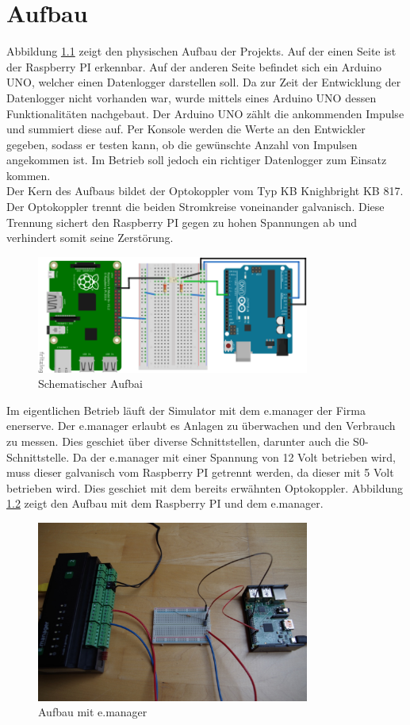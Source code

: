 \chapter{Aufbau}
Abbildung \ref{aufbau} zeigt den physischen Aufbau der Projekts. Auf der einen Seite ist der Raspberry PI erkennbar. Auf der anderen Seite befindet sich ein Arduino UNO, welcher einen Datenlogger darstellen soll. Da zur Zeit der Entwicklung der Datenlogger nicht vorhanden war, wurde mittels eines Arduino UNO dessen Funktionalitäten nachgebaut. Der Arduino UNO zählt die ankommenden Impulse und summiert diese auf. Per Konsole werden die Werte an den Entwickler gegeben, sodass er testen kann, ob die gewünschte Anzahl von Impulsen angekommen ist. Im Betrieb soll jedoch ein richtiger Datenlogger zum Einsatz kommen.\\
Der Kern des Aufbaus bildet der Optokoppler vom Typ KB Knighbright KB 817. Der Optokoppler trennt die beiden Stromkreise voneinander galvanisch. Diese Trennung sichert den Raspberry PI gegen zu hohen Spannungen ab und verhindert somit seine Zerstörung. 
\begin{figure}[H]
 	\centering
 	\includegraphics[width=0.8\textwidth]{bilder/aufbau.png}
 	\caption{Schematischer Aufbai}
	\label{aufbau}
\end{figure}
\noindent
Im eigentlichen Betrieb läuft der Simulator mit dem e.manager der Firma enerserve. Der e.manager erlaubt es Anlagen zu überwachen und den Verbrauch zu messen. Dies geschiet über diverse Schnittstellen, darunter auch die S0-Schnittstelle. Da der e.manager mit einer Spannung von 12 Volt betrieben wird, muss dieser galvanisch vom Raspberry PI getrennt werden, da dieser mit 5 Volt betrieben wird. Dies geschiet mit dem bereits erwähnten Optokoppler. Abbildung \ref{emanager} zeigt den Aufbau mit dem Raspberry PI und dem e.manager.
 \begin{figure}[H]
 	\centering
 	\includegraphics[width=0.8\textwidth]{bilder/aufbau.jpg}%
 	\caption{Aufbau mit e.manager}
 	\label{emanager}
 \end{figure}
